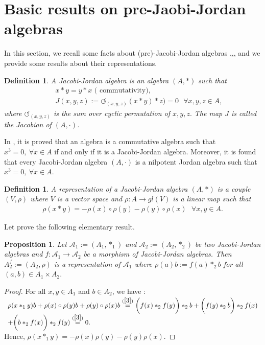 \documentclass[12pt]{amsart}
\newtheorem{definition}[Theorem]{Definition}
\newtheorem{proposition}[Theorem]{Proposition}
\begin{document}
	\section{Basic results on pre-Jaobi-Jordan algebras}
	In this section, we recall some facts about (pre)-Jacobi-Jordan algebras \cite{abak},\cite{absb},\cite{dbaf}, \cite{pzu}
	and we provide some results about their representations.
	\begin{definition}\cite{dbaf}\label{D2}
		A Jacobi-Jordan algebra is an algebra $(A,\ast)$ such that
		\begin{eqnarray}
			\label{3}
			&& x\ast y=y\ast x \mbox{ ( commutativity), }\nonumber\\
			&& J(x,y,z):=\circlearrowleft_{(x,y,z)}(x\ast y)\ast z)=0 \mbox{ \ \ $\forall  x,y,z\in A $,} \label{JJi}
		\end{eqnarray}
		where $\circlearrowleft_{(x,y,z)}$ is the sum over cyclic permutation of $x,y,z.$ The map 
		$J$ is called the Jacobian  of $(A,\cdot) $.
	\end{definition}
In \cite{dbaf}, it is proved that an algebra  is a commutative algebra such that $x^3 =0,\ \forall x\in A$ if and only if it is a Jacobi-Jordan algebra. Moreover, it is found \cite{absb} that every Jacobi-Jordan algebra $(A,\cdot)$ is a nilpotent Jordan algebra such that $x^3 =0,\ \forall x\in A.$
	\begin{definition}\cite{abak}\cite{pzu}\label{D3}
		A representation of a Jacobi-Jordan algebra $ (A,\ast) $ is a couple $ (V,\rho ) $ where $ V $ is a vector space and $ \rho : A\to gl(V) $ is a linear map such that
		\begin{eqnarray}
			\label{28}
			\rho(x\ast y)=-\rho(x)\circ \rho(y)-\rho(y)\circ \rho(x) \mbox{ \ \ $\forall  x,y\in A $.}
		\end{eqnarray}
	\end{definition}
Let prove the following elementary result.
	\begin{proposition}\label{Pro1}
		Let $\mathcal{A}_1:=(A_1, \ast_1)$ and $\mathcal{A}_2:=(A_2, \ast_2)$ be two Jacobi-Jordan algebras and $f:\mathcal{A}_1\rightarrow \mathcal{A}_2$ be a morphism of Jacobi-Jordan algebras. Then $A_2^f:=(A_2, \rho)$ is a representation of $\mathcal{A}_1$ where
		$\rho(a)b:=f(a)\ast_2 b$ for all $(a,b)\in A_1\times A_2.$
	\end{proposition}
	\begin{proof}For all $ x,y\in A_1 $ and $ b\in A_2 $, we have :\\
		$ \begin{array}{lll}
			\rho(x\ast_1 y)b+\rho(x)\circ\rho(y)b+\rho(y)\circ\rho(x)b\stackrel{(\ref{3})}{=}\biggl(f(x)\ast_2f(y)\biggr)\ast_2b+\biggl(f(y)\ast_2b\biggr)\ast_2f(x)\\
			+\biggl(b\ast_2f(x)\biggr)\ast_2f(y)\stackrel{(\ref{3})}{=}0.
		\end{array} $\\
		Hence, $\rho(x\ast_1 y)=-\rho(x)\rho(y)-\rho(y)\rho(x).$
	\end{proof}
\end{document}
